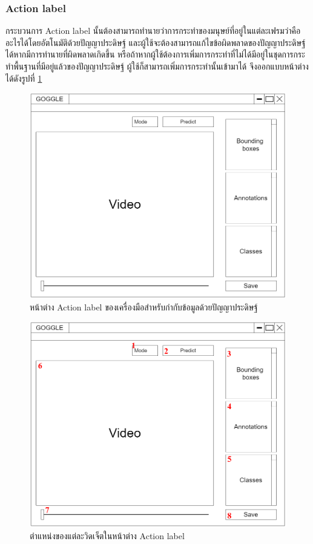 \subsubsection{Action label}
กระบวนการ Action label นั้นต้องสามารถทำนายว่าการกระทำของมนุษย์ที่อยู่ในแต่ละเฟรมว่าคืออะไรได้โดยอัตโนมัติด้วยปัญญาประดิษฐ์
และผู้ใช้จะต้องสามารถแก้ไขข้อผิดพลาดของปัญญาประดิษฐ์ได้หากมีการทำนายที่ผิดพลาดเกิดขึ้น
หรือถ้าหากผู้ใช้ต้องการเพิ่มการกระทำที่ไม่ได้มีอยู่ในชุดการกระทำพื้นฐานที่มีอยู่แล้วของปัญญาประดิษฐ์ ผู้ใช้ก็สามารถเพิ่มการกระทำนั้นเข้ามาได้
จึงออกแบบหน้าต่างได้ดังรูปที่ \ref{fig:ActionLabelDraft}
\begin{figure}[!ht]
    \centering
    \includegraphics[width=1\textwidth]{chapter3/images/3_6/ActionLabelDraft.png}
    \caption{หน้าต่าง Action label ของเครื่องมือสำหรับกำกับข้อมูลด้วยปัญญาประดิษฐ์}
    \label{fig:ActionLabelDraft}
\end{figure}
\clearpage
\begin{figure}[!ht]
    \centering
    \includegraphics[width=1\textwidth]{chapter3/images/3_6/ActionLabelDraft_point.png}
    \caption{ตำแหน่งของแต่ละวิดเจ็ตในหน้าต่าง Action label}
    \label{fig:ActiobLabelDraft_point}
\end{figure}
